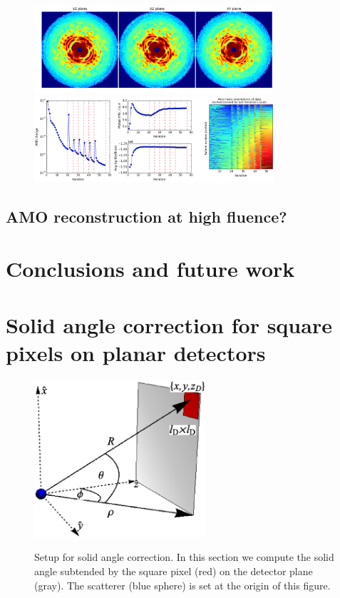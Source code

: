 \documentclass[]{iucr}              %
\begin{document}
\begin{figure}
\caption{}
\includegraphics[width=3.5in]{figures/cxi_intens_055.png} \label{fig:cxi_intens}
\includegraphics[width=3.5in]{figures/cxi_log_fig.png} \label{fig:cxi_log_fig}
\end{figure}

\subsection{AMO reconstruction at high fluence?}


\section{Conclusions and future work}


\appendix

\section{Solid angle correction for square pixels on planar detectors}
\begin{figure}
\caption{Setup for solid angle correction. In this section we compute the solid angle subtended by the square pixel (red) on the detector plane (gray). The scatterer (blue sphere) is set at the origin of this figure.}
\includegraphics[width=2.5in]{figures/solidAngle.eps} \label{fig:solidAngle}
\end{figure}
\end{document}
